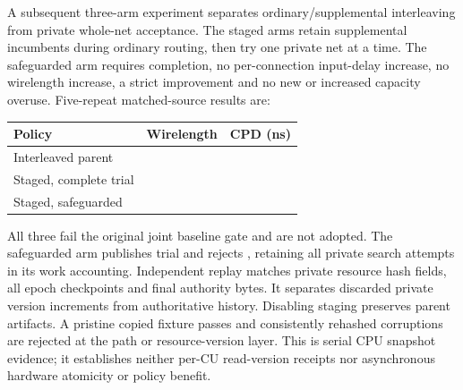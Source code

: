 \documentclass[10pt]{article}
\begin{document}
A subsequent three-arm experiment separates ordinary/supplemental
interleaving from private whole-net acceptance. The staged arms retain
supplemental incumbents during ordinary routing, then try one private net
at a time. The safeguarded arm requires completion, no per-connection
input-delay increase, no wirelength increase, a strict improvement and no
new or increased capacity overuse. Five-repeat matched-source results are:
\begin{center}
\begin{tabular}{lrr}
Policy & Wirelength & CPD (ns) \\
\hline
Interleaved parent & \NetTrialParentWL{} & \NetTrialParentCPD{} \\
Staged, complete trial & \NetTrialStagedWL{} & \NetTrialStagedCPD{} \\
Staged, safeguarded & \NetTrialGuardedWL{} & \NetTrialGuardedCPD{} \\
\end{tabular}
\end{center}
All three fail the original joint baseline gate and are not adopted.
The safeguarded arm publishes \NetTrialPublished{} trial and rejects
\NetTrialRejected{}, retaining all \NetTrialQueries{} private search
attempts in its work accounting. Independent replay matches
\NetTrialHashFields{} private resource hash fields, all epoch checkpoints
and final authority bytes. It separates \NetTrialDiscardedVersions{}
discarded private version increments from authoritative history.
Disabling staging preserves \NetTrialCompatible{} parent artifacts.
A pristine copied fixture passes and \NetTrialMutations{} consistently
rehashed corruptions are rejected at the path or resource-version layer.
This is serial CPU snapshot evidence; it establishes neither per-CU
read-version receipts nor asynchronous hardware atomicity or policy benefit.
\end{document}
